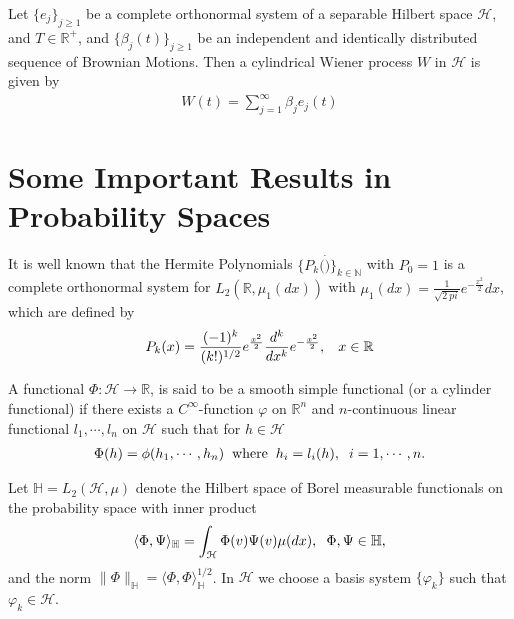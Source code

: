 	\begin{definition}
		\label{cylindrical}
		Let $\{e_j\}_{j \geq 1}$ be a complete orthonormal  system of a separable Hilbert space $\mathcal{H}$, and $T \in \mathbb{R}^+$, and $\{\beta_j (t)\}_{j \geq 1}$ be an independent and identically distributed sequence of Brownian Motions. Then a cylindrical Wiener process $W$ in $\mathcal{H}$ is given by
		\begin{align*}
			W(t) = \displaystyle \sum_{j=1}^{\infty} \beta_j e_j (t)
		\end{align*}	
	\end{definition}
	
	\section{Some Important Results in Probability Spaces}
	
	
	It is well known that the Hermite Polynomials $\{P_k (\dot) \}_{k \in \mathbb{N}}$ with $P_0 = 1$ is a complete orthonormal system for $L_2 (\mathbb{R}, \mu_1 (dx))$ with $\mu_1 (dx) = \frac{1}{\sqrt{2 \ pi}} e^{- \frac{x^2}{2}} dx$, which are defined by 
	\begin{align}
		\label{hermite_polynomials}
		P_k(x) = \frac{(-1)^k}{(k!)^{1/2}} e^{\frac{x^2}{2}} \frac{d^k}{dx^k} e^{-\frac{x^2}{2}}, \hspace{3mm} x \in \mathbb{R}
	\end{align}
	
	
	A functional $\Phi: \mathcal{H} \longrightarrow  \mathbb{R}$, is said to be a smooth simple functional (or a cylinder functional) if there exists a $C^{\infty} $-function $\varphi$ on $\mathbb{R}^n$ and $n$-continuous linear functional $l_1 ,\cdots ,l_n$ on $\mathcal{H}$ such that for $h \in \mathcal{H}$
	\begin{align*}
		\Phi(h) = \phi(h_1, \cdots, h_n) \hspace{2mm} \text{where} \hspace{2mm} h_i = l_i (h), \hspace{2mm} i = 1, \cdots, n.
	\end{align*}
	
	Let $\mathbb{H} = L_2 (\mathcal{H}, \mu)$ denote the Hilbert space of Borel measurable functionals on the probability space with inner product
	\begin{align}
		\label{Inner_Functionals}	
		\langle \Phi, \Psi \rangle_{\mathbb{H}} = \displaystyle \int_{\mathcal{H}} \Phi (v) \Psi (v) \mu (dx), \hspace{2mm} \Phi, \Psi \in \mathbb{H},
	\end{align}
	and the norm $\| \Phi \|_{\mathbb{H}} = \langle \Phi, \Phi\rangle_{\mathbb{H}}^{1/2}$. In $\mathcal{H}$ we choose a basis system $\{\varphi_k \}$ such that $\varphi_k \in \mathcal{H}$.\\	
	
